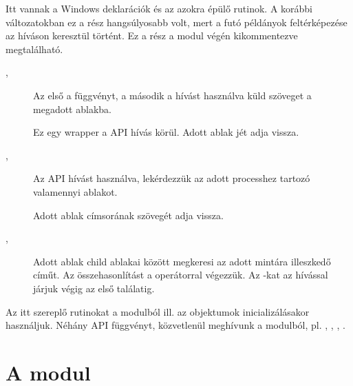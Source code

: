 Itt vannak a Windows  deklarációk és az azokra épülő rutinok. A
korábbi változatokban 
ez a rész hangsúlyosabb volt, mert a futó  példányok feltérképezése
az   
híváson keresztül történt. Ez a rész a modul végén kikommentezve megtalálható.
\begin{description}
\item[, ] Az első a 
  függvényt, a második a  hívást  használva küld szöveget
  a megadott ablakba.
\item[] Ez egy wrapper a
   API hívás körül. Adott ablak
  jét adja 
  vissza.
\item[, ] Az
   API hívást 
  használva, lekérdezzük az adott processhez tartozó valamennyi
  ablakot.  
\item[] Adott ablak címsorának szövegét adja vissza.

\item[, ] Adott ablak child
  ablakai között megkeresi 
  az adott mintára illeszkedő címűt. Az összehasonlítást a 
  operátorral végezzük. Az -kat  az 
  hívással járjuk végig az első találatig.  
\end{description}
Az itt szereplő rutinokat a   modulból ill. az 
objektumok inicializálásakor  használjuk. Néhány API függvényt,
közvetlenül meghívunk a   
  modulból, pl. , , ,
  .

\section{A  modul}\label{sec:5.6}

